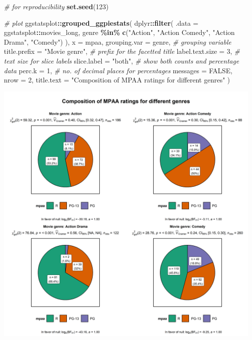 \documentclass[
]{article}
\newenvironment{Shaded}{\begin{snugshade}}{\end{snugshade}}
\newcommand{\CommentTok}[1]{\textcolor[rgb]{0.56,0.35,0.01}{\textit{#1}}}
\newcommand{\DataTypeTok}[1]{\textcolor[rgb]{0.13,0.29,0.53}{#1}}
\newcommand{\DecValTok}[1]{\textcolor[rgb]{0.00,0.00,0.81}{#1}}
\newcommand{\KeywordTok}[1]{\textcolor[rgb]{0.13,0.29,0.53}{\textbf{#1}}}
\newcommand{\NormalTok}[1]{#1}
\newcommand{\OperatorTok}[1]{\textcolor[rgb]{0.81,0.36,0.00}{\textbf{#1}}}
\newcommand{\OtherTok}[1]{\textcolor[rgb]{0.56,0.35,0.01}{#1}}
\newcommand{\StringTok}[1]{\textcolor[rgb]{0.31,0.60,0.02}{#1}}
\begin{document}
\begin{Shaded}
\begin{Highlighting}[]
\CommentTok{\# for reproducibility}
\KeywordTok{set.seed}\NormalTok{(}\DecValTok{123}\NormalTok{)}

\CommentTok{\# plot}
\NormalTok{ggstatsplot}\OperatorTok{::}\KeywordTok{grouped\_ggpiestats}\NormalTok{(}
\NormalTok{  dplyr}\OperatorTok{::}\KeywordTok{filter}\NormalTok{(}
    \DataTypeTok{.data =}\NormalTok{ ggstatsplot}\OperatorTok{::}\NormalTok{movies\_long,}
\NormalTok{    genre }\OperatorTok{\%in\%}\StringTok{ }\KeywordTok{c}\NormalTok{(}\StringTok{"Action"}\NormalTok{, }\StringTok{"Action Comedy"}\NormalTok{, }\StringTok{"Action Drama"}\NormalTok{, }\StringTok{"Comedy"}\NormalTok{)}
\NormalTok{  ),}
  \DataTypeTok{x =}\NormalTok{ mpaa,}
  \DataTypeTok{grouping.var =}\NormalTok{ genre, }\CommentTok{\# grouping variable}
  \DataTypeTok{title.prefix =} \StringTok{"Movie genre"}\NormalTok{, }\CommentTok{\# prefix for the facetted title}
  \DataTypeTok{label.text.size =} \DecValTok{3}\NormalTok{, }\CommentTok{\# text size for slice labels}
  \DataTypeTok{slice.label =} \StringTok{"both"}\NormalTok{, }\CommentTok{\# show both counts and percentage data}
  \DataTypeTok{perc.k =} \DecValTok{1}\NormalTok{, }\CommentTok{\# no. of decimal places for percentages}
  \DataTypeTok{messages =} \OtherTok{FALSE}\NormalTok{,}
  \DataTypeTok{nrow =} \DecValTok{2}\NormalTok{,}
  \DataTypeTok{title.text =} \StringTok{"Composition of MPAA ratings for different genres"}
\NormalTok{)}
\end{Highlighting}
\end{Shaded}

\includegraphics[width=1\linewidth]{./figures/paper-ggpiestats4-1}
\end{document}
